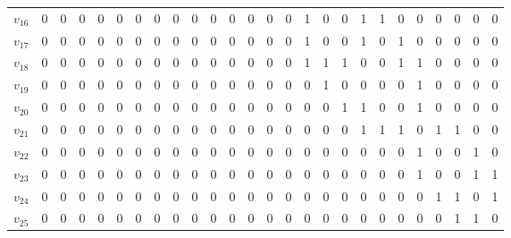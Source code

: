 \begin{tabular}{c|ccccccccccccccccccccccccc}
$v_{16}$ & 0 & 0 & 0 & 0 & 0 & 0 & 0 & 0 & 0 & 0 & 0 & 0 & 0 & 0 & 1 & 0 & 0 & 1 & 1 & 0 & 0 & 0 & 0 & 0 & 0 \\
$v_{17}$ & 0 & 0 & 0 & 0 & 0 & 0 & 0 & 0 & 0 & 0 & 0 & 0 & 0 & 0 & 1 & 0 & 0 & 1 & 0 & 1 & 0 & 0 & 0 & 0 & 0 \\
$v_{18}$ & 0 & 0 & 0 & 0 & 0 & 0 & 0 & 0 & 0 & 0 & 0 & 0 & 0 & 0 & 1 & 1 & 1 & 0 & 0 & 1 & 1 & 0 & 0 & 0 & 0 \\
$v_{19}$ & 0 & 0 & 0 & 0 & 0 & 0 & 0 & 0 & 0 & 0 & 0 & 0 & 0 & 0 & 0 & 1 & 0 & 0 & 0 & 0 & 1 & 0 & 0 & 0 & 0 \\
$v_{20}$ & 0 & 0 & 0 & 0 & 0 & 0 & 0 & 0 & 0 & 0 & 0 & 0 & 0 & 0 & 0 & 0 & 1 & 1 & 0 & 0 & 1 & 0 & 0 & 0 & 0 \\
$v_{21}$ & 0 & 0 & 0 & 0 & 0 & 0 & 0 & 0 & 0 & 0 & 0 & 0 & 0 & 0 & 0 & 0 & 0 & 1 & 1 & 1 & 0 & 1 & 1 & 0 & 0 \\
$v_{22}$ & 0 & 0 & 0 & 0 & 0 & 0 & 0 & 0 & 0 & 0 & 0 & 0 & 0 & 0 & 0 & 0 & 0 & 0 & 0 & 0 & 1 & 0 & 0 & 1 & 0 \\
$v_{23}$ & 0 & 0 & 0 & 0 & 0 & 0 & 0 & 0 & 0 & 0 & 0 & 0 & 0 & 0 & 0 & 0 & 0 & 0 & 0 & 0 & 1 & 0 & 0 & 1 & 1 \\
$v_{24}$ & 0 & 0 & 0 & 0 & 0 & 0 & 0 & 0 & 0 & 0 & 0 & 0 & 0 & 0 & 0 & 0 & 0 & 0 & 0 & 0 & 0 & 1 & 1 & 0 & 1 \\
$v_{25}$ & 0 & 0 & 0 & 0 & 0 & 0 & 0 & 0 & 0 & 0 & 0 & 0 & 0 & 0 & 0 & 0 & 0 & 0 & 0 & 0 & 0 & 0 & 1 & 1 & 0 \\
\end{tabular}
